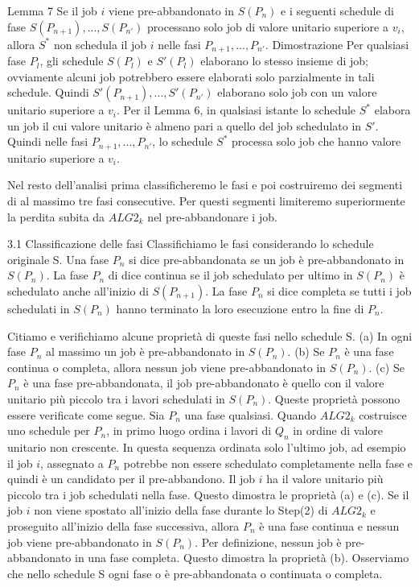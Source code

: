 \documentclass[12pt]{article}
\begin{document}
Lemma 7
Se il job $i$ viene pre-abbandonato in $S(P_{n})$ e i seguenti schedule di fase $S(P_{n + 1}), . . . , S(P_{n'})$ processano solo job di valore unitario superiore a $v_{i}$, allora $S^{*}$ non schedula il job $i$ nelle fasi $P_{n + 1}, . . . , P_{n'}$.
Dimostrazione
Per qualsiasi fase $P_{l}$, gli schedule $S(P_{l})$ e $S'(P_{l})$ elaborano lo stesso insieme di job; ovviamente alcuni job potrebbero essere elaborati solo parzialmente in tali schedule. Quindi $S'(P_{n + 1}), . . . , S'(P_{n'})$ elaborano solo job con un valore unitario superiore a $v_{i}$. Per il Lemma 6, in qualsiasi istante lo schedule $S^*$ elabora un job il cui valore unitario è almeno pari a quello del job schedulato in $S'$. Quindi nelle fasi $P_{n + 1}, . . . , P_{n'}$, lo schedule $S^{*}$ processa solo job che hanno valore unitario superiore a $v_{i}$.

Nel resto dell'analisi prima classificheremo le fasi e poi costruiremo dei segmenti di al massimo tre fasi consecutive. Per questi segmenti limiteremo superiormente la perdita subita da $ALG2_{k}$ nel pre-abbandonare i job.

3.1 Classificazione delle fasi
Classifichiamo le fasi considerando lo schedule originale S. Una fase $P_{n}$ si dice pre-abbandonata se un job è pre-abbandonato in $S(P_{n})$. La fase $P_{n}$ di dice continua se il job schedulato per ultimo in $S(P_{n})$ è schedulato anche all'inizio di $S(P_{n + 1})$. La fase $P_{n}$ si dice completa se tutti i job schedulati in $S(P_{n})$ hanno terminato la loro esecuzione entro la fine di $P_{n}$. 

Citiamo e verifichiamo alcune proprietà di queste fasi nello schedule S. (a) In ogni fase $P_{n}$ al massimo un job è pre-abbandonato in $S(P_{n})$. 
(b) Se $P_{n}$ è una fase continua o completa, allora nessun job viene pre-abbandonato in $S(P_{n})$. 
(c) Se $P_{n}$ è una fase pre-abbandonata, il job pre-abbandonato è quello con il valore unitario più piccolo tra i lavori schedulati in $S(P_{n})$. Queste proprietà possono essere verificate come segue. Sia $P_{n}$ una fase qualsiasi. Quando $ALG2_{k}$ costruisce uno schedule per $P_{n}$, in primo luogo ordina i lavori di $Q_{n}$ in ordine di valore unitario non crescente. In questa sequenza ordinata solo l'ultimo job, ad esempio il job $i$, assegnato a $P_{n}$ potrebbe non essere schedulato completamente nella fase e quindi è un candidato per il pre-abbandono. Il job $i$ ha il valore unitario più piccolo tra i job schedulati nella fase. Questo dimostra le proprietà (a) e (c). Se il job $i$ non viene spostato all'inizio della fase durante lo Step(2) di $ALG2_{k}$ e proseguito all'inizio della fase successiva, allora $P_{n}$ è una fase continua e nessun job viene pre-abbandonato in $S(P_{n})$. Per definizione, nessun job è pre-abbandonato in una fase completa. Questo dimostra la proprietà (b). Osserviamo che nello schedule S ogni fase o è pre-abbandonata o continuata o completa.
\end{document}
